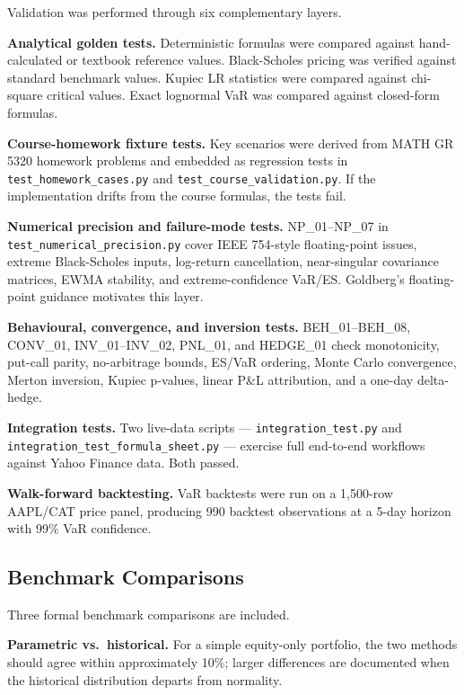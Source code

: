 \documentclass[11pt]{article}
\newcommand{\code}[1]{\texttt{#1}}
\begin{document}
Validation was performed through six complementary layers.

\textbf{Analytical golden tests.}  Deterministic formulas were compared
against hand-calculated or textbook reference values.  Black-Scholes
pricing was verified against standard benchmark values.  Kupiec LR
statistics were compared against chi-square critical values.  Exact
lognormal VaR was compared against closed-form formulas.

\textbf{Course-homework fixture tests.}  Key scenarios were derived from
MATH GR 5320 homework problems and embedded as regression tests in
\code{test\_homework\_cases.py} and
\code{test\_course\_\allowbreak validation.py}.
If the implementation drifts from the course formulas, the tests fail.

\textbf{Numerical precision and failure-mode tests.}  NP\_01--NP\_07 in
\code{test\_numerical\_precision.py} cover IEEE 754-style floating-point
issues, extreme Black-Scholes inputs, log-return cancellation, near-singular
covariance matrices, EWMA stability, and extreme-confidence VaR/ES.
Goldberg's floating-point guidance \cite{goldberg1991} motivates this layer.

\textbf{Behavioural, convergence, and inversion tests.}  BEH\_01--BEH\_08,
CONV\_01, INV\_01--INV\_02, PNL\_01, and HEDGE\_01 check monotonicity,
put-call parity, no-arbitrage bounds, ES/VaR ordering, Monte Carlo
convergence, Merton inversion, Kupiec p-values, linear P\&L attribution,
and a one-day delta-hedge.

\textbf{Integration tests.}  Two live-data scripts ---
\code{integration\_test.py} and
\code{integration\_test\_\allowbreak formula\_sheet.py} ---
exercise full end-to-end workflows against Yahoo Finance data.  Both passed.

\textbf{Walk-forward backtesting.}  VaR backtests were run on a 1{,}500-row
AAPL/CAT price panel, producing 990 backtest observations at a 5-day
horizon with 99\% VaR confidence.

\subsection{Benchmark Comparisons}

Three formal benchmark comparisons are included.

\textbf{Parametric vs.\ historical.}  For a simple equity-only portfolio,
the two methods should agree within approximately 10\%; larger differences
are documented when the historical distribution departs from normality.
\end{document}
